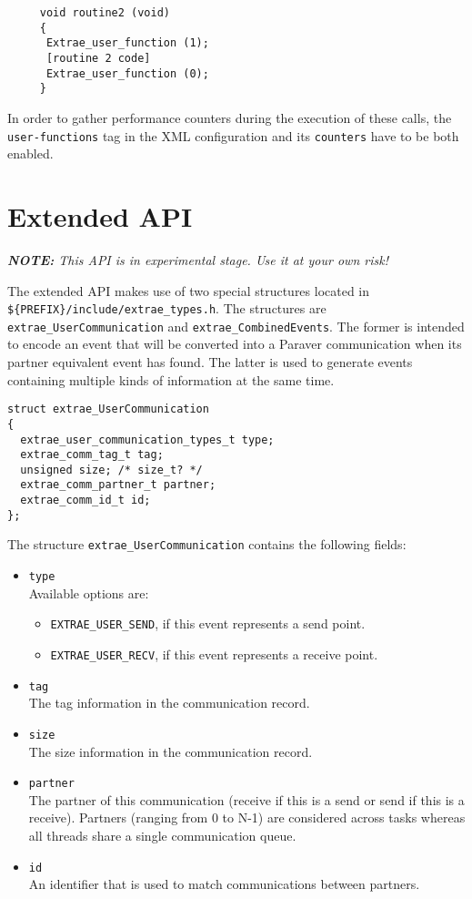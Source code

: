\begin{itemize}
\begin{verbatim}
     void routine2 (void)
     {
      Extrae_user_function (1);
      [routine 2 code]
      Extrae_user_function (0);
     }
   \end{verbatim}
   In order to gather performance counters during the execution of these calls, the {\tt user-functions} tag in the XML configuration and its {\tt counters} have to be both enabled.

\end{itemize}

\section{Extended API}\label{sec:ExtendedAPI}

{\em {\bf NOTE:} This API is in experimental stage. Use it at your own risk!}

The extended API makes use of two special structures located in {\tt \$\{PREFIX\}/include/extrae\_types.h}. The structures are {\tt extrae\_UserCommunication} and {\tt extrae\_CombinedEvents}. The former is intended to encode an event that will be converted into a Paraver communication when its partner equivalent event has found. The latter is used to generate events containing multiple kinds of information at the same time.

\begin{verbatim}
struct extrae_UserCommunication
{
  extrae_user_communication_types_t type;
  extrae_comm_tag_t tag;
  unsigned size; /* size_t? */
  extrae_comm_partner_t partner;
  extrae_comm_id_t id;
};
\end{verbatim}

The structure {\tt extrae\_UserCommunication} contains the following fields:
\begin{itemize}
	\item {\tt type}\\
	Available options are:
	\begin{itemize}
		\item {\tt EXTRAE\_USER\_SEND}, if this event represents a send point.
		\item {\tt EXTRAE\_USER\_RECV}, if this event represents a receive point.
	\end{itemize}
	\item {\tt tag}\\
	The tag information in the communication record. 
	\item {\tt size}\\
	The size information in the communication record.
	\item {\tt partner}\\
	The partner of this communication (receive if this is a send or send if this is a receive). Partners (ranging from 0 to N-1) are considered across tasks whereas all threads share a single communication queue.
	\item {\tt id}\\
	An identifier that is used to match communications between partners.
\end{itemize}

